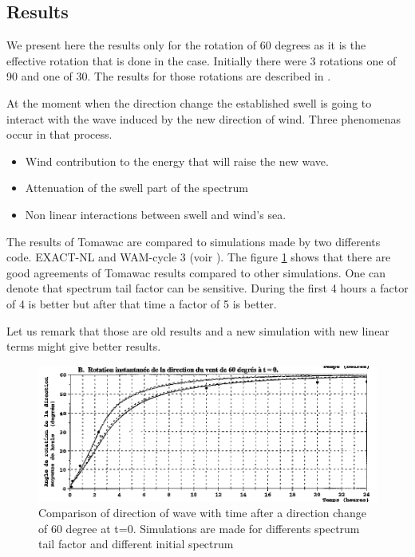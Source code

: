 \subsection{Results}
%
We present here the results only for the rotation of 60 degrees as it is the effective rotation that is done in the case. Initially there were 3 rotations one of 90 and one of 30. The results for those rotations are described in \cite{Benoit1996_2}.

At the moment when the direction change the established swell is going to interact with the wave induced by the new direction of wind. Three phenomenas occur in that process.
\begin {itemize}
\item Wind contribution to the energy that will raise the new wave.
\item Attenuation of the swell part of the spectrum
\item Non linear interactions between swell and wind's sea.
\end{itemize}

The results of Tomawac are compared to simulations made by two differents code. EXACT-NL and WAM-cycle 3 (voir \cite{Vanvledder1990}). The figure  \ref{resturnwind} shows that there are good agreements of Tomawac results compared to other simulations. One can denote that spectrum tail factor can be sensitive. During the first 4 hours a factor of 4 is better but after that time a factor of 5 is better.

Let us remark that those are old results and a new simulation with new linear terms might give better results.

\begin{figure} [!h]
\centering
\includegraphics[scale = 0.45]{resuTW60.png}
 \caption{Comparison of direction of wave with time after a direction change of 60 degree at t=0. Simulations are made for differents spectrum tail factor and different initial spectrum}
\label{resturnwind}
\end{figure}


